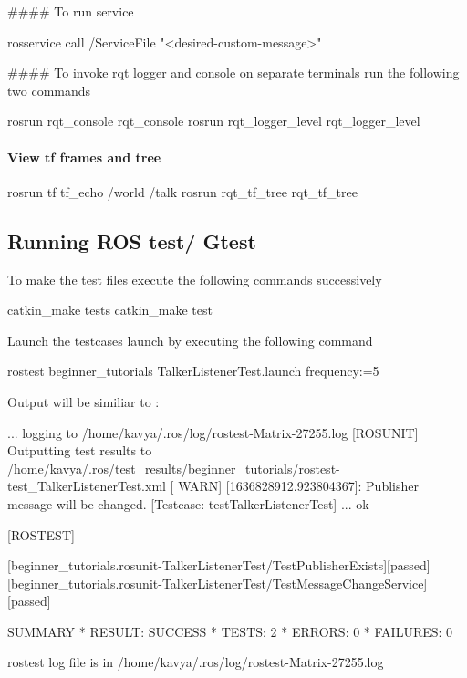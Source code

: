 \#\#\#\# To run service 
\begin{DoxyCode}
rosservice call /ServiceFile "<desired-custom-message>"
\end{DoxyCode}


\#\#\#\# To invoke rqt logger and console on separate terminals run the following two commands 
\begin{DoxyCode}
rosrun rqt\_console rqt\_console
rosrun rqt\_logger\_level rqt\_logger\_level
\end{DoxyCode}


\paragraph*{View tf frames and tree}


\begin{DoxyCode}
rosrun tf tf\_echo /world /talk
rosrun rqt\_tf\_tree rqt\_tf\_tree
\end{DoxyCode}


\subsection*{Running R\+OS test/ Gtest}

To make the test files execute the following commands successively 
\begin{DoxyCode}
catkin\_make tests
catkin\_make test
\end{DoxyCode}


Launch the testcases launch by executing the following command 
\begin{DoxyCode}
rostest beginner\_tutorials TalkerListenerTest.launch frequency:=5
\end{DoxyCode}


Output will be similiar to \+:


\begin{DoxyCode}
... logging to /home/kavya/.ros/log/rostest-Matrix-27255.log
[ROSUNIT] Outputting test results to
       /home/kavya/.ros/test\_results/beginner\_tutorials/rostest-test\_TalkerListenerTest.xml
[ WARN] [1636828912.923804367]: Publisher message will be changed.
[Testcase: testTalkerListenerTest] ... ok

[ROSTEST]-----------------------------------------------------------------------

[beginner\_tutorials.rosunit-TalkerListenerTest/TestPublisherExists][passed]
[beginner\_tutorials.rosunit-TalkerListenerTest/TestMessageChangeService][passed]

SUMMARY
 * RESULT: SUCCESS
 * TESTS: 2
 * ERRORS: 0
 * FAILURES: 0

rostest log file is in /home/kavya/.ros/log/rostest-Matrix-27255.log
\end{DoxyCode}


